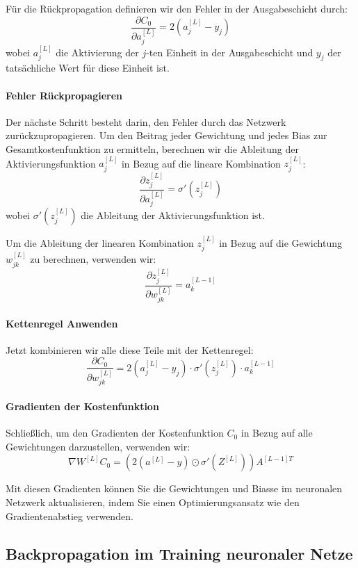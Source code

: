 Für die Rückpropagation definieren wir den Fehler in der Ausgabeschicht durch:
\[
\frac{\partial C_0}{\partial a_j^{[L]}} = 2 \left( a_j^{[L]} - y_j \right)
\]
wobei \( a_j^{[L]} \) die Aktivierung der \( j \)-ten Einheit in der Ausgabeschicht und \( y_j \) der tatsächliche Wert für diese Einheit ist.

\paragraph{Fehler Rückpropagieren}

Der nächste Schritt besteht darin, den Fehler durch das Netzwerk zurückzupropagieren. Um den Beitrag jeder Gewichtung und jedes Bias zur Gesamtkostenfunktion zu ermitteln, berechnen wir die Ableitung der Aktivierungsfunktion \( a_j^{[L]} \) in Bezug auf die lineare Kombination \( z_j^{[L]} \):
\[
\frac{\partial z_j^{[L]}}{\partial a_j^{[L]}} = \sigma' \left( z_j^{[L]} \right)
\]
wobei \( \sigma' \left( z_j^{[L]} \right) \) die Ableitung der Aktivierungsfunktion ist.

Um die Ableitung der linearen Kombination \( z_j^{[L]} \) in Bezug auf die Gewichtung \( w_{jk}^{[L]} \) zu berechnen, verwenden wir:
\[
\frac{\partial z_j^{[L]}}{\partial w_{jk}^{[L]}} = a_k^{[L-1]}
\]

\paragraph{Kettenregel Anwenden}

Jetzt kombinieren wir alle diese Teile mit der Kettenregel:
\[
\frac{\partial C_0}{\partial w_{jk}^{[L]}} = 2 \left( a_j^{[L]} - y_j \right) \cdot \sigma' \left( z_j^{[L]} \right) \cdot a_k^{[L-1]}
\]

\paragraph{Gradienten der Kostenfunktion}

Schließlich, um den Gradienten der Kostenfunktion \( C_0 \) in Bezug auf alle Gewichtungen darzustellen, verwenden wir:
\[
\nabla W^{[L]} C_0 = \left( 2 \left( a^{[L]} - y \right) \odot \sigma' \left( Z^{[L]} \right) \right) A^{[L-1]T}
\]

Mit diesen Gradienten können Sie die Gewichtungen und Biasse im neuronalen Netzwerk aktualisieren, indem Sie einen Optimierungsansatz wie den Gradientenabstieg verwenden.

\subsection{Backpropagation im Training neuronaler Netze}

